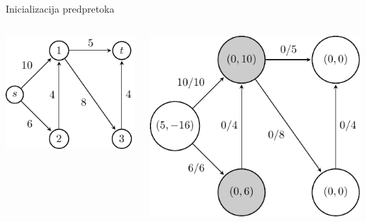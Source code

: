 \documentclass{beamer}
\begin{document}
\begin{frame}{Inicializacija predpretoka}
    \begin{columns}
        \begin{column}{0.5\textwidth}
            \centering
            \includegraphics[scale=1.2]{../writing/images/graf2-1.pdf}
        \end{column}
        \pause
        \begin{column}{0.5\textwidth}
            \centering
            \includegraphics[scale=0.7]{../writing/images/graf2-2.pdf}
        \end{column}
    \end{columns}
\end{frame}
\end{document}
